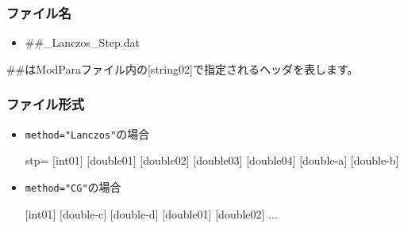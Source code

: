 \subsubsection{ファイル名}
 \begin{itemize}
   \item  \#\#\_Lanczos\_Step.dat
  \end{itemize}
  \#\#はModParaファイル内の[string02]で指定されるヘッダを表します。

\subsubsection{ファイル形式}

\begin{itemize}
\item \verb|method="Lanczos"|の場合

  stp= $[$int01$]$ $[$double01$]$ $[$double02$]$ $[$double03$]$ $[$double04$]$ $[$double-a$]$ $[$double-b$]$
\item \verb|method="CG"|の場合

  $[$int01$]$ $[$double-c$]$ $[$double-d$]$ $[$double01$]$ $[$double02$]$ ...
\end{itemize}

